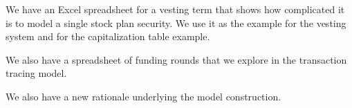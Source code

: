 \documentclass[12pt]{article}
\begin{document}
We have an Excel spreadsheet for a vesting term that shows how complicated it is to model a single stock plan security. We use it as the example for the vesting system and for the capitalization table example.

We also have a spreadsheet of funding rounds that we explore in the transaction tracing model.

We also have a new rationale underlying the model construction.
\end{document}
